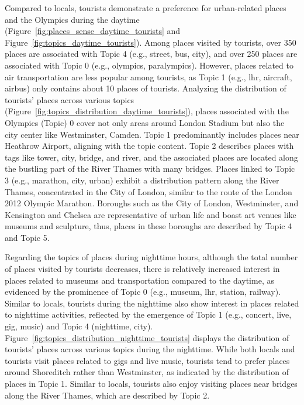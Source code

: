 \documentclass{article}
\theoremstyle{definition}
\theoremstyle{remark}
\begin{document}
Compared to locals, tourists demonstrate a preference for urban-related places and the Olympics during the daytime (Figure~\ref{fig:places_sense_daytime_tourists} and Figure~\ref{fig:topics_daytime_tourists}). Among places visited by tourists, over 350 places are associated with Topic 4 (e.g., street, bus, city), and over 250 places are associated with Topic 0 (e.g., olympics, paralympics). However, places related to air transportation are less popular among tourists, as Topic 1 (e.g., lhr, aircraft, airbus) only contains about 10 places of tourists. Analyzing the distribution of tourists' places across various topics (Figure~\ref{fig:topics_distribution_daytime_tourists}), places associated with the Olympics (Topic) 0 cover not only areas around London Stadium but also the city center like Westminster, Camden. Topic 1 predominantly includes places near Heathrow Airport, aligning with the topic content. Topic 2 describes places with tags like tower, city, bridge, and river, and the associated places are located along the bustling part of the River Thames with many bridges. Places linked to Topic 3 (e.g., marathon, city, urban) exhibit a distribution pattern along the River Thames, concentrated in the City of London, similar to the route of the London 2012 Olympic Marathon. Boroughs such as the City of London, Westminster, and Kensington and Chelsea are representative of urban life and boast art venues like museums and sculpture, thus, places in these boroughs are described by Topic 4 and Topic 5.

Regarding the topics of places during nighttime hours, although the total number of places visited by tourists decreases, there is relatively increased interest in places related to museums and transportation compared to the daytime, as evidenced by the prominence of Topic 0 (e.g., museum, lhr, station, railway). Similar to locals, tourists during the nighttime also show interest in places related to nighttime activities, reflected by the emergence of Topic 1 (e.g., concert, live, gig, music) and Topic 4 (nighttime, city). Figure~\ref{fig:topics_distribution_nighttime_tourists} displays the distribution of tourists' places across various topics during the nighttime. While both locals and tourists visit places related to gigs and live music, tourists tend to prefer places around Shoreditch rather than Westminster, as indicated by the distribution of places in Topic 1. Similar to locals, tourists also enjoy visiting places near bridges along the River Thames, which are described by Topic 2.
\end{document}
